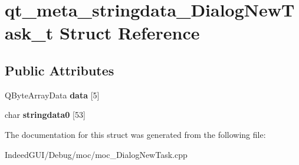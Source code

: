 \hypertarget{structqt__meta__stringdata___dialog_new_task__t}{}\section{qt\+\_\+meta\+\_\+stringdata\+\_\+\+Dialog\+New\+Task\+\_\+t Struct Reference}
\label{structqt__meta__stringdata___dialog_new_task__t}
\subsection*{Public Attributes}
\begin{DoxyCompactItemize}
\item 
\hypertarget{structqt__meta__stringdata___dialog_new_task__t_aca75892e048662dbbedb223252676a05}{}Q\+Byte\+Array\+Data {\bfseries data} \mbox{[}5\mbox{]}\label{structqt__meta__stringdata___dialog_new_task__t_aca75892e048662dbbedb223252676a05}

\item 
\hypertarget{structqt__meta__stringdata___dialog_new_task__t_a8764b43a419e81416691d5e1030c8271}{}char {\bfseries stringdata0} \mbox{[}53\mbox{]}\label{structqt__meta__stringdata___dialog_new_task__t_a8764b43a419e81416691d5e1030c8271}

\end{DoxyCompactItemize}


The documentation for this struct was generated from the following file\+:\begin{DoxyCompactItemize}
\item 
Indeed\+G\+U\+I/\+Debug/moc/moc\+\_\+\+Dialog\+New\+Task.\+cpp\end{DoxyCompactItemize}
